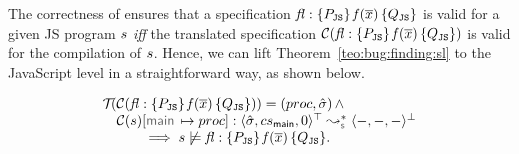 The correctness of \JSComp ensures that 
%
 a \javert  specification ${\mathit{fl}} : \{ P_{\mathtt{JS}} \} \, \mathit{f}(\overline{x}) \, \{ Q_{\mathtt{JS}} \}$
is valid for a given JS program $s$ \emph{iff} the translated specification 
$\mathcal{C}({\mathit{fl}} : \{ P_{\mathtt{JS}} \} \, \mathit{f}(\overline{x}) \, \{ Q_{\mathtt{JS}} \})$ is valid 
for the compilation of $s$.
Hence, we can lift Theorem~\ref{teo:bug:finding:sl} to the JavaScript level in a straightforward way, 
as shown below. 

\begin{corollary}\label{teo:bug:finding:sl:javert}
$$
\begin{array}{l}
\testify{}(\compile(\specsig{\pass_\jssubscript}{\pid(\jvec{x})}{\qass_\jssubscript}{\flag}))  = (\proc, \sstate) \, \wedge \\
\quad
  \compile(\jstmt)[\jsilmain \mapsto \proc] :  \transabssemrule{\sstate, \csmain, 0}{-, -, -}{\top}{\bot}{\symbolic} \\ \quad \qquad 
    \implies  
         \jstmt \not\satisfies \specsig{\pass_\jssubscript}{\pid(\jvec{x})}{\qass_\jssubscript}{\flag}.
\end{array}
$$
\end{corollary}


